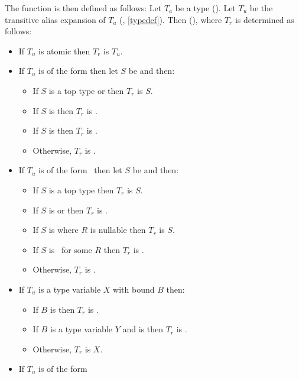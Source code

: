 \documentclass[makeidx]{article}
\begin{document}
{\LMHash{}%
The function \Index{\NormalizedTypeOfName} is then defined as follows:
%
Let $T_a$ be a type
().
Let $T_u$ be the transitive alias expansion of $T_a$
(, \ref{typedef}).
Then 
(),
where $T_r$ is determined as follows:

\begin{itemize}
\item
  If $T_u$ is atomic then $T_r$ is $T_u$.
\item If $T_u$ is of the form 
  then let $S$ be  and then:
  \begin{itemize}
  \item If $S$ is a top type or  then $T_r$ is $S$.
  \item If $S$ is  then $T_r$ is .
  \item If $S$ is  then $T_r$ is .
  \item Otherwise, $T_r$ is .
  \end{itemize}
\item If $T_u$ is of the form \ then
  let $S$ be  and then:
  \begin{itemize}
  \item If $S$ is a top type then $T_r$ is $S$.
  \item If $S$ is  or  then
    $T_r$ is .
  \item If $S$ is  where $R$ is nullable then
    $T_r$ is $S$.
  \item If $S$ is \ for some $R$ then $T_r$ is .
  \item Otherwise, $T_r$ is .
  \end{itemize}
\item If $T_u$ is a type variable $X$ with bound $B$ then:
  \begin{itemize}
  \item If $B$ is  then $T_r$ is .
  \item If $B$ is a type variable $Y$
    and  is 
    then $T_r$ is .
  \item Otherwise, $T_r$ is $X$.
  \end{itemize}
\item If $T_u$ is of the form 

\end{itemize}}
\end{document}
